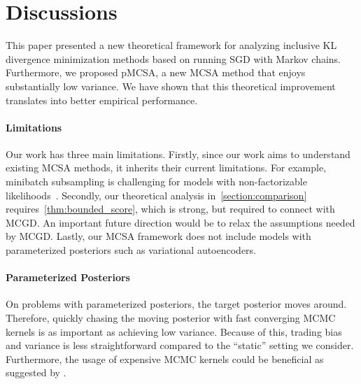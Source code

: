 
\vspace{-1.5ex}
\section{Discussions}\label{section:discussion}
\vspace{-1.5ex}
This paper presented a new theoretical framework for analyzing inclusive KL divergence minimization methods based on running SGD with Markov chains.
Furthermore, we proposed pMCSA, a new MCSA method that enjoys substantially low variance.
We have shown that this theoretical improvement translates into better empirical performance.

\vspace{-1.5ex}
\paragraph{Limitations}
Our work has three main limitations.
Firstly, since our work aims to understand existing MCSA methods, it inherits their current limitations.
For example, minibatch subsampling is challenging for models with non-factorizable likelihoods~\citep{NEURIPS2020_b2070693}.
Secondly, our theoretical analysis in~\cref{section:comparison} requires~\cref{thm:bounded_score}, which is strong, but required to connect with MCGD.
An important future direction would be to relax the assumptions needed by MCGD.
Lastly, our MCSA framework does not include models with parameterized posteriors such as variational autoencoders.

\vspace{-1.5ex}
\paragraph{Parameterized Posteriors}
On problems with parameterized posteriors, the target posterior moves around.
Therefore, quickly chasing the moving posterior with fast converging MCMC kernels is as important as achieving low variance.
Because of this, trading bias and variance is less straightforward compared to the ``static'' setting we consider.
Furthermore, the usage of expensive MCMC kernels could be beneficial as suggested by \citet{zhang_transport_2022}.

\vspace{-1.5ex}
